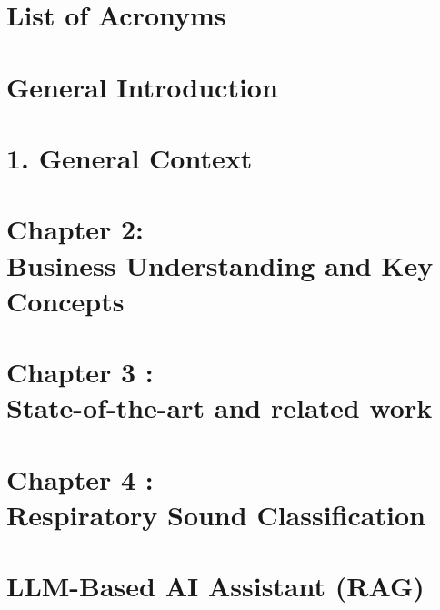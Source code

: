 \documentclass[12pt]{report}
\begin{document}
\chapter*{List of Acronyms}


\listoffigures


\newpage


\chapter*{General Introduction}


\chapter{1. General Context}


\newpage

\setcounter{chapter}{2}  %
\setcounter{section}{0}
\chapter*{Chapter 2:\\ Business Understanding and Key Concepts}





\newpage

\setcounter{chapter}{3}
\setcounter{section}{0}
\chapter*{Chapter 3 :\\ State-of-the-art and related work}



\setcounter{chapter}{4}
\chapter*{Chapter 4 :\\ Respiratory Sound Classification}








\chapter{LLM-Based AI Assistant (RAG)} %
\label{chap:llm-rag}
\end{document}
